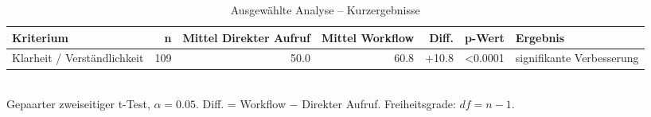 \begin{table}[htbp]
\centering
\caption{Ausgewählte Analyse -- Kurzergebnisse}
\begin{tabular}{lrrrrrl}
\toprule
Kriterium & n & Mittel Direkter Aufruf & Mittel Workflow & Diff. & p-Wert & Ergebnis \\
\midrule
Klarheit / Verständlichkeit & 109 & 50.0 & 60.8 & +10.8 & <0.0001 & signifikante Verbesserung \\
\bottomrule
\end{tabular}
\\[2mm]
\footnotesize Gepaarter zweiseitiger t-Test, $\alpha=0.05$. Diff. = Workflow $-$ Direkter Aufruf. Freiheitsgrade: $df=n-1$.
\end{table}

